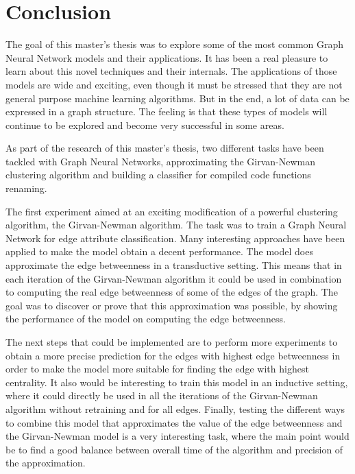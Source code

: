 \newpage
\section{Conclusion}


The goal of this master's thesis was to explore some of the most common Graph Neural Network models and their applications. It has been a real pleasure to learn about this novel techniques and their internals. The applications of those models are wide and exciting, even though it must be stressed that they are not general purpose machine learning algorithms. But in the end, a lot of data can be expressed in a graph structure. The feeling is that these types of models will continue to be explored and become very successful in some areas.


As part of the research of this master's thesis, two different tasks have been tackled with Graph Neural Networks, approximating the Girvan-Newman clustering algorithm and building a classifier for compiled code functions renaming.

The first experiment aimed at an exciting modification of a powerful clustering algorithm, the Girvan-Newman algorithm. The task was to train a Graph Neural Network for edge attribute classification. Many interesting approaches have been applied to make the model obtain a decent performance. The model does approximate the edge betweenness in a transductive setting. This means that in each iteration of the Girvan-Newman algorithm it could be used in combination to computing the real edge betweenness of some of the edges of the graph. The goal was to discover or prove that this approximation was possible, by showing the performance of the model on computing the edge betweenness.

The next steps that could be implemented are to perform more experiments to obtain a more precise prediction for the edges with highest edge betweenness in order to make the model more suitable for finding the edge with highest centrality. It also would be interesting to train this model in an inductive setting, where it could directly be used in all the iterations of the Girvan-Newman algorithm without retraining and for all edges. Finally, testing the different ways to combine this model that approximates the value of the edge betweenness and the Girvan-Newman model is a very interesting task, where the main point would be to find a good balance between overall time of the algorithm and precision of the approximation.

